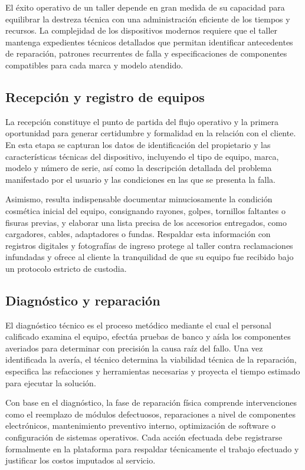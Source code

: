 El éxito operativo de un taller depende en gran medida de su capacidad para equilibrar la destreza técnica con una administración eficiente de los tiempos y recursos. La complejidad de los dispositivos modernos requiere que el taller mantenga expedientes técnicos detallados que permitan identificar antecedentes de reparación, patrones recurrentes de falla y especificaciones de componentes compatibles para cada marca y modelo atendido.

\subsection{Recepción y registro de equipos}

La recepción constituye el punto de partida del flujo operativo y la primera oportunidad para generar certidumbre y formalidad en la relación con el cliente. En esta etapa se capturan los datos de identificación del propietario y las características técnicas del dispositivo, incluyendo el tipo de equipo, marca, modelo y número de serie, así como la descripción detallada del problema manifestado por el usuario y las condiciones en las que se presenta la falla.

Asimismo, resulta indispensable documentar minuciosamente la condición cosmética inicial del equipo, consignando rayones, golpes, tornillos faltantes o fisuras previas, y elaborar una lista precisa de los accesorios entregados, como cargadores, cables, adaptadores o fundas. Respaldar esta información con registros digitales y fotografías de ingreso protege al taller contra reclamaciones infundadas y ofrece al cliente la tranquilidad de que su equipo fue recibido bajo un protocolo estricto de custodia.

\subsection{Diagnóstico y reparación}

El diagnóstico técnico es el proceso metódico mediante el cual el personal calificado examina el equipo, efectúa pruebas de banco y aísla los componentes averiados para determinar con precisión la causa raíz del fallo. Una vez identificada la avería, el técnico determina la viabilidad técnica de la reparación, especifica las refacciones y herramientas necesarias y proyecta el tiempo estimado para ejecutar la solución.

Con base en el diagnóstico, la fase de reparación física comprende intervenciones como el reemplazo de módulos defectuosos, reparaciones a nivel de componentes electrónicos, mantenimiento preventivo interno, optimización de software o configuración de sistemas operativos. Cada acción efectuada debe registrarse formalmente en la plataforma para respaldar técnicamente el trabajo efectuado y justificar los costos imputados al servicio.

